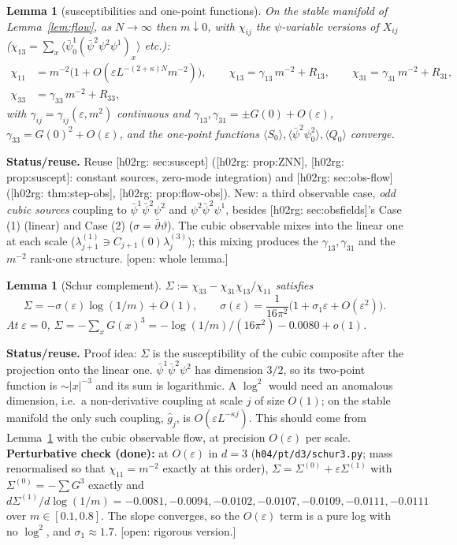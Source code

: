 \documentclass[11pt]{article}
\newtheorem{lemma}[theorem]{Lemma}
\theoremstyle{definition}
\theoremstyle{remark}
\newcommand{\avg}[1]{\langle #1\rangle}
\newcommand{\eps}{\varepsilon}
\newcommand{\bpsi}{\bar\psi}
\newcommand{\status}[1]{\par\smallskip\noindent\textbf{Status/reuse.} #1\par\smallskip}
\newcommand{\reuse}[1]{\textsf{[h02rg: #1]}}
\newcommand{\open}[1]{\textcolor{red!60!black}{\textsf{[open: #1]}}}
\begin{document}
\begin{lemma}[susceptibilities and one-point functions]\label{lem:obs}
  On the stable manifold of Lemma~\ref{lem:flow}, as $N\to\infty$ then $m\downarrow0$,
  with $\chi_{ij}$ the $\psi$-variable versions of $X_{ij}$
  ($\chi_{13}=\sum_x\avg{\bpsi^1_0(\bpsi^2\psi^2\psi^1)_x}$ etc.):
  \begin{align*}
    \chi_{11}&=m^{-2}\big(1+O(\eps L^{-(2+\kappa)N}m^{-2})\big),\qquad
    \chi_{13}=\gamma_{13}\,m^{-2}+R_{13},\qquad \chi_{31}=\gamma_{31}\,m^{-2}+R_{31},\\
    \chi_{33}&=\gamma_{33}\,m^{-2}+R_{33},
  \end{align*}
  with $\gamma_{ij}=\gamma_{ij}(\eps,m^2)$ continuous and $\gamma_{13},\gamma_{31}=\pm G(0)+O(\eps)$,
  $\gamma_{33}=G(0)^2+O(\eps)$, and the one-point functions $\avg{S_0},\avg{\bpsi^2\psi^2_0},\avg{Q_0}$ converge.
\end{lemma}
\status{Reuse \reuse{sec:suscept} (\reuse{prop:ZNN}, \reuse{prop:suscept}: constant
sources, zero-mode integration) and \reuse{sec:obs-flow} (\reuse{thm:step-obs},
\reuse{prop:flow-obs}). New: a third observable case, \emph{odd cubic sources} coupling to
$\bpsi^1\bpsi^2\psi^2$ and $\psi^2\bpsi^2\psi^1$, besides \reuse{sec:obsfields}'s Case (1)
(linear) and Case (2) ($\sigma=\bar\vartheta\vartheta$). The cubic observable mixes into the
linear one at each scale ($\lambda^{(1)}_{j+1}\ni C_{j+1}(0)\lambda^{(3)}_j$); this mixing
produces the $\gamma_{13},\gamma_{31}$ and the $m^{-2}$ rank-one structure. \open{whole lemma.}}

\begin{lemma}[Schur complement]\label{lem:schur}
  $\Sigma:=\chi_{33}-\chi_{31}\chi_{13}/\chi_{11}$ satisfies
  \[
    \Sigma=-\sigma(\eps)\log(1/m)+O(1),\qquad
    \sigma(\eps)=\frac{1}{16\pi^2}\big(1+\sigma_1\eps+O(\eps^2)\big).
  \]
  At $\eps=0$, $\Sigma=-\sum_xG(x)^3=-\log(1/m)/(16\pi^2)-0.0080+o(1)$.
\end{lemma}
\status{Proof idea: $\Sigma$ is the susceptibility of the cubic composite after the projection
onto the linear one. $\bpsi^1\bpsi^2\psi^2$ has dimension $3/2$, so its two-point function
is $\sim|x|^{-3}$ and its sum is logarithmic. A $\log^2$ would need an anomalous dimension,
i.e.\ a non-derivative coupling at scale $j$ of size $O(1)$; on the stable manifold the
only such coupling, $\hat g_j$, is $O(\eps L^{-\kappa j})$. This should come from
Lemma~\ref{lem:obs} with the cubic observable flow, at precision $O(\eps)$ per scale.
\textbf{Perturbative check (done):} at $O(\eps)$ in $d=3$ (\texttt{h04/pt/d3/schur3.py};
mass renormalised so that $\chi_{11}=m^{-2}$ exactly at this order),
$\Sigma=\Sigma^{(0)}+\eps\Sigma^{(1)}$ with $\Sigma^{(0)}=-\sum G^3$ exactly and
$d\Sigma^{(1)}/d\log(1/m)=-0.0081,-0.0094,-0.0102,-0.0107,-0.0109,-0.0111,-0.0111$
over $m\in[0.1,0.8]$. The slope converges, so the $O(\eps)$ term is a pure log with no $\log^2$, and
$\sigma_1\approx1.7$. \open{rigorous version.}}
\end{document}
